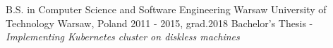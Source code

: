 

\begin{cventries}

    \cventry
    {B.S. in Computer Science and Software Engineering} %
    {Warsaw University of Technology} %
    {Warsaw, Poland} %
    {2011 - 2015, grad.2018} %
    {
        Bachelor's Thesis - \em{Implementing Kubernetes cluster on diskless machines}
    }

\end{cventries}
